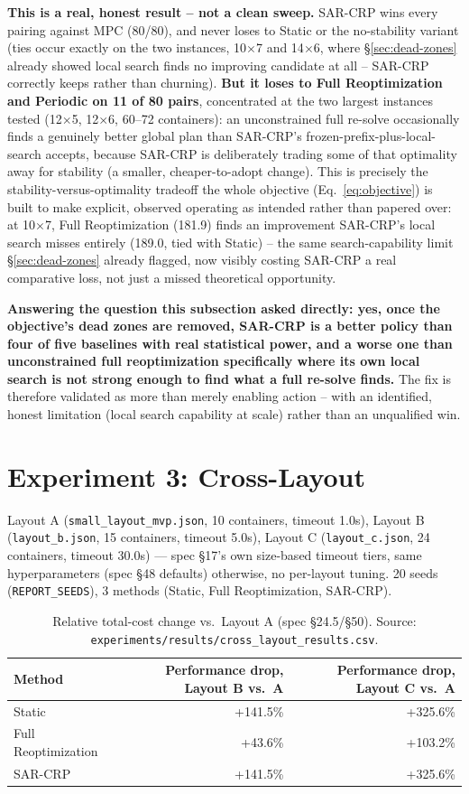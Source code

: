 \documentclass[11pt]{article}
\begin{document}
\textbf{This is a real, honest result -- not a clean sweep.} SAR-CRP wins
every pairing against MPC (80/80), and never loses to Static or the
no-stability variant (ties occur exactly on the two instances,
10$\times$7 and 14$\times$6, where \S\ref{sec:dead-zones} already showed
local search finds no improving candidate at all -- SAR-CRP correctly
keeps rather than churning). \textbf{But it loses to Full Reoptimization
and Periodic on 11 of 80 pairs}, concentrated at the two largest
instances tested (12$\times$5, 12$\times$6, 60--72 containers): an
unconstrained full re-solve occasionally finds a genuinely better global
plan than SAR-CRP's frozen-prefix-plus-local-search accepts, because
SAR-CRP is deliberately trading some of that optimality away for
stability (a smaller, cheaper-to-adopt change). This is precisely the
stability-versus-optimality tradeoff the whole objective
(Eq.~\ref{eq:objective}) is built to make explicit, observed operating as
intended rather than papered over: at 10$\times$7, Full Reoptimization
(181.9) finds an improvement SAR-CRP's local search misses entirely
(189.0, tied with Static) -- the same search-capability limit
\S\ref{sec:dead-zones} already flagged, now visibly costing SAR-CRP a real
comparative loss, not just a missed theoretical opportunity.

\textbf{Answering the question this subsection asked directly: yes, once
the objective's dead zones are removed, SAR-CRP is a better policy than
four of five baselines with real statistical power, and a worse one than
unconstrained full reoptimization specifically where its own local search
is not strong enough to find what a full re-solve finds.} The fix is
therefore validated as more than merely enabling action -- with an
identified, honest limitation (local search capability at scale) rather
than an unqualified win.

\section{Experiment 3: Cross-Layout}

Layout A (\texttt{small\_layout\_mvp.json}, 10 containers, timeout 1.0s),
Layout B (\texttt{layout\_b.json}, 15 containers, timeout 5.0s), Layout C
(\texttt{layout\_c.json}, 24 containers, timeout 30.0s) --- spec \S17's
own size-based timeout tiers, same hyperparameters (spec \S48 defaults)
otherwise, no per-layout tuning. 20 seeds (\texttt{REPORT\_SEEDS}), 3
methods (Static, Full Reoptimization, SAR-CRP).

\begin{table}[h]
\centering
\small
\begin{tabular}{lrr}
\hline
Method & Performance drop, Layout B vs.\ A & Performance drop, Layout C vs.\ A \\
\hline
Static & +141.5\% & +325.6\% \\
Full Reoptimization & +43.6\% & +103.2\% \\
SAR-CRP & +141.5\% & +325.6\% \\
\hline
\end{tabular}
\caption{Relative total-cost change vs.\ Layout A (spec \S24.5/\S50). Source: \texttt{experiments/results/cross\_layout\_results.csv}.}
\end{table}
\end{document}
